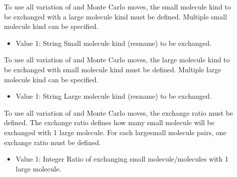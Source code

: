 \documentclass[letterpaper,10pt,english]{sphinxmanual}
\begin{document}
\begin{description}
\item[{}] \leavevmode
To use all variation of  and  Monte Carlo moves, the small molecule kind to be exchanged with a large molecule kind must be defined. Multiple small molecule kind can be specified.
\begin{itemize}
\item {} 
Value 1: String \sphinxhyphen{} Small molecule kind (resname) to be exchanged.

\end{itemize}

\item[{}] \leavevmode
To use all variation of  and  Monte Carlo moves, the large molecule kind to be exchanged with small molecule kind must be defined. Multiple large molecule kind can be specified.
\begin{itemize}
\item {} 
Value 1: String \sphinxhyphen{} Large molecule kind (resname) to be exchanged.

\end{itemize}

\item[{}] \leavevmode
To use all variation of  and  Monte Carlo moves, the exchange ratio must be defined. The exchange ratio defines how many small molecule will be exchanged with 1 large molecule. For each large\sphinxhyphen{}small molecule pairs, one exchange ratio must be defined.
\begin{itemize}
\item {} 
Value 1: Integer \sphinxhyphen{} Ratio of exchanging small molecule/molecules with 1 large molecule.

\end{itemize}


\end{description}
\end{document}
